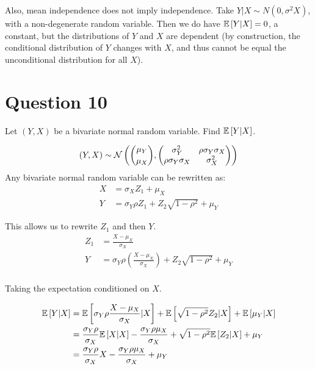 \documentclass[12pt]{paper}
\begin{document}
Also, mean independence does not imply independence. Take $Y|X\sim N(0,\sigma^2 X)$, with a non-degenerate random variable. Then we do have $\mathbb{E} \left [ Y|X \right ]=0$, a constant, but the distributions of $Y$ and $X$ are dependent (by construction, the conditional distribution of $Y$ changes with $X$, and thus cannot be equal the unconditional distribution for all $X$). 

\section*{Question 10}

Let $(Y,X)$ be a bivariate normal random variable. Find $\mathbb{E} \left [ Y \vert
  X \right ]$. \newline \newline

\begin{equation*}
  (Y,X) \sim \mathcal{N} \left( \binom{\mu_Y}{\mu_X},
    \begin{pmatrix}
      \sigma_Y^2 & \rho \sigma_Y \sigma_X\\
      \rho \sigma_Y \sigma_X & \sigma_X^2
    \end{pmatrix}
  \right)
\end{equation*}
Any bivariate normal random variable can be rewritten as:
\begin{align*}
  X &= \sigma_X Z_1 + \mu_X\\
  Y &= \sigma_Y \rho Z_1 + Z_2 \sqrt{ 1 - \rho^2} + \mu_Y
\end{align*}

This allows us to rewrite $Z_1$ and then $Y$.
\begin{align*}
  Z_1 &= \frac{X - \mu_X}{\sigma_X}\\
  Y &= \sigma_Y \rho \left( \frac{X - \mu_X}{\sigma_X} \right) + Z_2\sqrt{ 1 - \rho^2} + \mu_Y\\
\end{align*}

Taking the expectation conditioned on $X$.

\begin{align*}
  \mathbb{E} \left [ Y \vert X \right ] &= \mathbb{E} \left [  \sigma_Y \rho \frac{X - \mu_X}{\sigma_X} \vert X \right ] + \mathbb{E} \left [  \sqrt{ 1 - \rho^2}
            Z_2 \vert X \right ] + \mathbb{E} \left [ \mu_Y \vert X \right ]\\
  &= \frac{\sigma_Y \rho}{\sigma_X} \mathbb{E} \left [ X \vert X \right ] - \frac{\sigma_Y \rho \mu_X}{\sigma_X} + \sqrt{ 1
    - \rho^2} \mathbb{E} \left [  Z_2 \vert X \right ] + \mu_Y\\
  &= \frac{\sigma_Y \rho}{\sigma_X} X - \frac{\sigma_Y \rho \mu_X}{\sigma_X} + \mu_Y
\end{align*}
\end{document}
